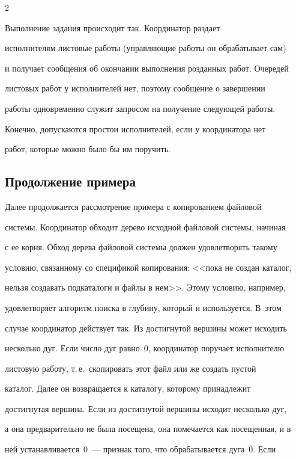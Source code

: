 \begin{multicols}{2}
      


      Выполнение задания происходит так. Координатор раздает 


исполнителям листовые работы (управляющие работы он обрабатывает сам) 


и получает сообщения об окончании выполнения розданных работ. Очередей 


листовых работ у исполнителей нет, поэтому сообщение о завершении 


работы одновременно служит запросом на получение следующей работы. 


Конечно, допускаются простои исполнителей, если у координатора нет 


работ, которые можно было бы им поручить.





\subsection{Продолжение примера}


      


      Далее продолжается рассмотрение примера с копированием файловой 


системы. Координатор обходит дерево исходной файловой системы, начиная 


с ее корня. Обход дерева файловой системы должен удовлетворять такому 


условию, связанному со спецификой копирования: <<пока не создан каталог, 


нельзя создавать подкаталоги и файлы в нем>>. Этому условию, например, 


удовлетворяет алгоритм поиска в глубину, который и используется. В~этом 


случае координатор действует так. Из достигнутой вершины может исходить 


несколько дуг. Если число дуг равно~0, координатор поручает исполнителю 


листовую работу, т.\,е.\ скопировать этот файл или же создать пустой 


каталог. Далее он возвращается к каталогу, которому принадлежит 


достигнутая вершина. Если из достигнутой вершины исходит несколько дуг, 


а она предварительно не была посещена, она помечается как посещенная, и в 


ней устанавливается~0~--- признак того, что обрабатывается дуга~0. Если 



\end{multicols}
